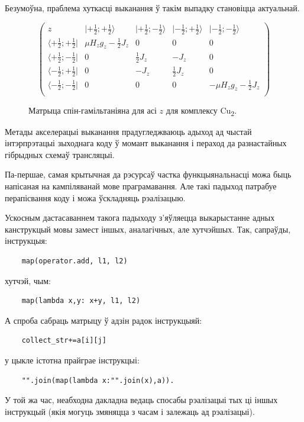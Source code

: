 \documentclass[a4paper,12pt]{article}
\begin{document}
Безумоўна, праблема хуткасці выканання ў такім выпадку становіцца актуальнай.

\begin{figure}[ht]
$$
\left(
\begin{array}{c|cccc}
z &|+\frac{1}{2};+\frac{1}{2}\rangle&|+\frac{1}{2};-\frac{1}{2}\rangle&|-\frac{1}{2};+\frac{1}{2}\rangle&|-\frac{1}{2};-\frac{1}{2}\rangle\\
\hline
\langle+\frac{1}{2};+\frac{1}{2}|& \mu H_z g_z-\frac{1}{2}J_z & 0 & 0 & 0\\
\langle+\frac{1}{2};-\frac{1}{2}|& 0 & \frac{1}{2}J_z  & -J_z & 0\\
\langle-\frac{1}{2};+\frac{1}{2}|& 0 & -J_z & \frac{1}{2}J_z & 0\\
\langle-\frac{1}{2};-\frac{1}{2}|& 0 & 0 & 0 & -\mu H_zg_z-\frac{1}{2}J_z\\
\end{array}
\right)
$$
\caption{Матрыца спін-гамільтаніяна для асі $z$ для комплексу Cu\textsubscript{2}.}
\label{fig:spin_ham}
\end{figure}

Метады акселерацыі выканання прадугледжваюць адыход ад чыстай інтэрпрэтацыі зыходнага коду ў момант выканання і пераход да разнастайных гібрыдных схемаў трансляцыі.

Па-першае, самая крытычная да рэсурсаў частка функцыянальнасці можа быць напісаная на кампіляванай мове праграмавання. Але такі падыход патрабуе перапісвання коду і можа ўскладняць рэалізацыю.

Ускосным дастасаваннем такога падыходу з'яўляецца выкарыстанне адных канструкцый мовы замест іншых, аналагічных, але хутчэйшых\cite{Optimize}.  Так, сапраўды, інструкцыя:
\begin{lstlisting}
    map(operator.add, l1, l2) 
\end{lstlisting}
хутчэй, чым:
\begin{lstlisting}
    map(lambda x,y: x+y, l1, l2)
\end{lstlisting}
 А спроба сабраць матрыцу ў адзін радок інструкцыяй:
\begin{lstlisting}
    collect_str+=a[i][j]  
\end{lstlisting}
 у цыкле істотна прайграе інструкцыі:
\begin{lstlisting} 
    "".join(map(lambda x:"".join(x),a)).
\end{lstlisting}
У той жа час, неабходна дакладна ведаць спосабы рэалізацыі тых ці іншых інструкцый (якія могуць змяняцца з часам і залежаць ад рэалізацыі).
\end{document}
